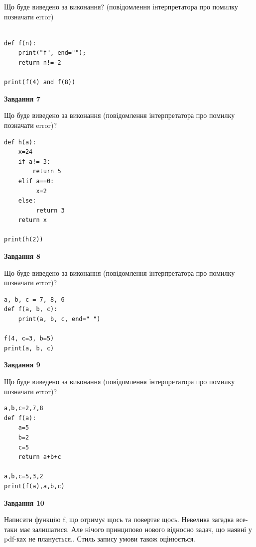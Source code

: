 \documentclass[12pt, ukrainian]{article}
\begin{document}
{\begin {large}
Що буде виведено за виконання? (повідомлення інтерпретатора про помилку позначати error)\par
\begin{verbatim}

def f(n):
    print("f", end="");
    return n!=-2

print(f(4) and f(8))
\end{verbatim}

{\begin {center}\textbf{Завдання 7}\end {center}}

Що буде виведено за виконання (повідомлення інтерпретатора про помилку позначати error)?\par
\begin{verbatim}
def h(a):
    x=24
    if a!=-3: 
        return 5
    elif a==0:
         x=2
    else:
         return 3
    return x

print(h(2))
\end{verbatim}

{\begin {center}\textbf{Завдання 8}\end {center}}

Що буде виведено за виконання (повідомлення інтерпретатора про помилку позначати error)?\par
\begin{verbatim}
a, b, c = 7, 8, 6
def f(a, b, c):
    print(a, b, c, end=" ")

f(4, c=3, b=5)
print(a, b, c)
\end{verbatim}

{\begin {center}\textbf{Завдання 9}\end {center}}

Що буде виведено за виконання (повідомлення інтерпретатора про помилку позначати error)?\par
\begin{verbatim}
a,b,c=2,7,8
def f(a):
    a=5
    b=2
    c=5
    return a+b+c

a,b,c=5,3,2
print(f(a),a,b,c)
\end{verbatim}

{\begin {center}\textbf{Завдання 10}\end {center}}


Написати функцiю f, що отримує щось та повертає щось. Невелика загадка все-таки має залишатися. Але нічого принципово нового відносно задач, що наявні у pdf-ках не планується.. Стиль запису умови також оцінюється.\par
\end {large}}
\newpage
\end{document}
